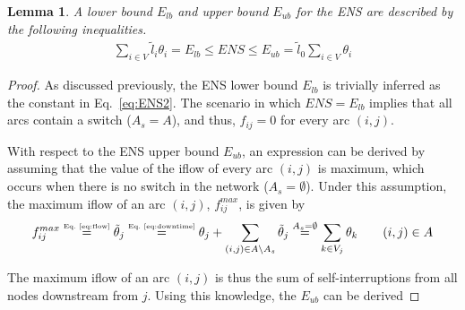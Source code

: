 \documentclass{article}
\newtheorem{lemma}{Lemma}
\begin{document}
\begin{lemma} \label{lem:Eminmax}
A lower bound $E_{lb}$ and upper bound $E_{ub}$ for the ENS are described by the following inequalities.
 	\begin{align} 
		\displaystyle \sum_{i \in V}{\tilde{l}_i\theta_{i}} = E_{lb} \leqslant ENS \leqslant E_{ub} = \tilde{l}_0\sum_{i \in V}{\theta_{i}} \label{eq:Eminmax}
	\end{align}
\end{lemma}
\begin{proof}
As discussed previously, the ENS lower bound $E_{lb}$ is trivially inferred as the constant in Eq.~\eqref{eq:ENS2}. The scenario in which $ENS = E_{lb}$ implies that all arcs contain a switch ($A_{s} = A$), and thus, $f_{ij} = 0$ for every arc $(i,j)$.

With respect to the ENS upper bound $E_{ub}$, an expression can be derived by assuming that the value of the iflow of every arc $(i,j)$ is maximum, which occurs when there is no switch in the network ($A_{s} = \emptyset$). Under this assumption, the maximum iflow of an arc $(i,j)$, $f_{ij}^{max}$, is given by
 	\begin{align} \label{eq:maxflow}
		f^{max}_{ij} \stackrel{\mbox{\tiny Eq.~\ref{eq:flow}}}{=} \tilde{\theta}_{j} \stackrel{\mbox{\tiny Eq.~\ref{eq:downtime}}}{=} \theta_j + \sum_{(i,j) \in A \setminus A_{s}}{\tilde{\theta}_{j}} \stackrel{A_{s} = \emptyset}{=} \sum_{k \in V_j}{\theta_{k}} \qquad (i,j) \in A
	\end{align}

The maximum iflow of an arc $(i,j)$ is thus the sum of self-interruptions from all nodes downstream from $j$. Using this knowledge, the $E_{ub}$ can be derived


\end{proof}
\end{document}
